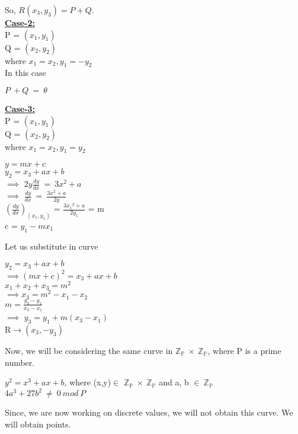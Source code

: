 \documentclass[11pt]{article}
\begin{document}
So, \( R(x_3, y_3) = P + Q \).\\

\textbf{\underline{Case-2:}}\\
P = $(x_1,y_1)$\\
Q = $(x_2,y_2)$\\
where $x_1=x_2, y_1=-y_2$\\
In this case\\
\begin{center}
    $P \ \boxed{+} Q\ =\ \theta$
\end{center}
\textbf{\underline{Case-3:}}\\
P = $(x_1,y_1)$\\
Q = $(x_2,y_2)$\\
where $x_1=x_2, y_1=y_2$\\
\begin{center}
    $y = mx+c$\\
    $y_2=x_3+ax+b$\\
    $\implies$ $2y\frac{dy}{dx}\ =\ 3x^2+a$\\
    $\implies$ $\frac{dy}{dx}\ =\ \frac{3x^2+a}{2y}$\\
    ${(\frac{dy}{dx})}_{(x_1,y_1)}$ = $\frac{3{x_1}^2+a}{2y_1}$ = m\\
    \vspace{3mm}
    c = $y_1-mx_1$\\
\end{center}
Let us substitute in curve
\begin{center}
    $y_2=x_3+ax+b$\\
    $\implies$${(mx+c)}^2 = x_3+ax+b$\\
    $x_1+x_2+x_3=m^2$\\
    $\implies$$x_3=m^2-x_1-x_2$\\
    $m = \frac{y_3-y_1}{x_3-x_1}$\\
    $\implies$ $y_3 = y_1+m(x_3-x_1)$\\
    R$\rightarrow(x_3,-y_3)$\\
\end{center}
Now, we will be considering the same curve in $\mathbb{Z_P}\ \times\ \mathbb{Z_P}$, where P is a prime number.
\begin{center}
    $y^2=x^3+ax+b$, where (x,y)$\in$ $\mathbb{Z_P}\ \times\ \mathbb{Z_P}$ and a, b $\in\ \mathbb{Z_P}$\\
    $4a^3+27b^2\ \neq\ 0\ mod\ P$\\
\end{center}
Since, we are now working on discrete values, we will not obtain this curve. We will obtain points.\\
\\
\end{document}

